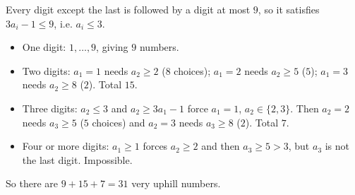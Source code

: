Every digit except the last is followed by a digit at most $9$, so it satisfies $3a_i-1\le9$, i.e. $a_i\le3$.
\begin{itemize}
\item One digit: $1,\dots,9$, giving $9$ numbers.
\item Two digits: $a_1=1$ needs $a_2\ge2$ ($8$ choices); $a_1=2$ needs $a_2\ge5$ ($5$); $a_1=3$ needs $a_2\ge8$ ($2$). Total $15$.
\item Three digits: $a_2\le3$ and $a_2\ge3a_1-1$ force $a_1=1$, $a_2\in\{2,3\}$. Then $a_2=2$ needs $a_3\ge5$ ($5$ choices) and $a_2=3$ needs $a_3\ge8$ ($2$). Total $7$.
\item Four or more digits: $a_1\ge1$ forces $a_2\ge2$ and then $a_3\ge5>3$, but $a_3$ is not the last digit. Impossible.
\end{itemize}
So there are $9+15+7=\boxed{31}$ very uphill numbers.
